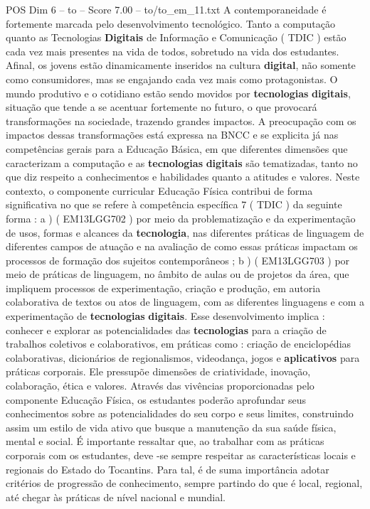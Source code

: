 \begin{textsample}{POS Dim 6 – to – Score 7.00 – to/to\_em\_11.txt}
A contemporaneidade é fortemente marcada pelo desenvolvimento tecnológico.
Tanto a computação quanto as Tecnologias \textbf{Digitais} de Informação e Comunicação ( TDIC ) estão cada vez mais presentes na vida de todos, sobretudo na vida dos estudantes.
Afinal, os jovens estão dinamicamente inseridos na cultura \textbf{digital}, não somente como consumidores, mas se engajando cada vez mais como protagonistas.
O mundo produtivo e o cotidiano estão sendo movidos por \textbf{tecnologias} \textbf{digitais}, situação que tende a se acentuar fortemente no futuro, o que provocará transformações na sociedade, trazendo grandes impactos.
A preocupação com os impactos dessas transformações está expressa na BNCC e se explicita já nas competências gerais para a Educação Básica, em que diferentes dimensões que caracterizam a computação e as \textbf{tecnologias} \textbf{digitais} são tematizadas, tanto no que diz respeito a conhecimentos e habilidades quanto a atitudes e valores.
Neste contexto, o componente curricular Educação Física contribui de forma significativa no que se refere à competência específica 7 ( TDIC ) da seguinte forma : a ) ( EM13LGG702 ) por meio da problematização e da experimentação de usos, formas e alcances da \textbf{tecnologia}, nas diferentes práticas de linguagem de diferentes campos de atuação e na avaliação de como essas práticas impactam os processos de formação dos sujeitos contemporâneos ; b ) ( EM13LGG703 ) por meio de práticas de linguagem, no âmbito de aulas ou de projetos da área, que impliquem processos de experimentação, criação e produção, em autoria colaborativa de textos ou atos de linguagem, com as diferentes linguagens e com a experimentação de \textbf{tecnologias} \textbf{digitais}.
Esse desenvolvimento implica : conhecer e explorar as potencialidades das \textbf{tecnologias} para a criação de trabalhos coletivos e colaborativos, em práticas como : criação de enciclopédias colaborativas, dicionários de regionalismos, videodança, jogos e \textbf{aplicativos} para práticas corporais.
Ele pressupõe dimensões de criatividade, inovação, colaboração, ética e valores.
Através das vivências proporcionadas pelo componente Educação Física, os estudantes poderão aprofundar seus conhecimentos sobre as potencialidades do seu corpo e seus limites, construindo assim um estilo de vida ativo que busque a manutenção da sua saúde física, mental e social.
É importante ressaltar que, ao trabalhar com as práticas corporais com os estudantes, deve -se sempre respeitar as características locais e regionais do Estado do Tocantins.
Para tal, é de suma importância adotar critérios de progressão de conhecimento, sempre partindo do que é local, regional, até chegar às práticas de nível nacional e mundial.

\end{textsample}
